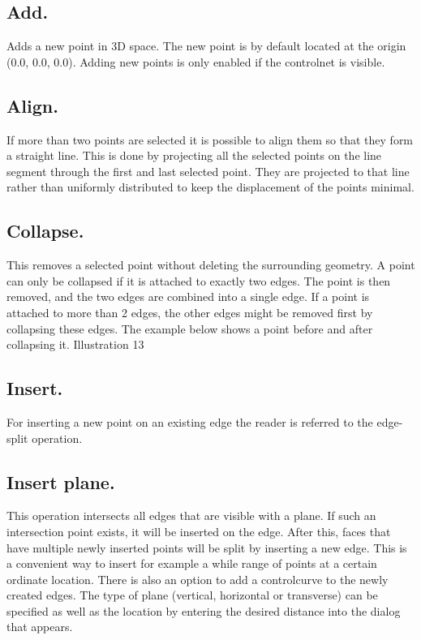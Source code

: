 \documentclass[12pt]{article}
\begin{document}
\subsection{Add.}
Adds a new point in 3D space. The new point is by default located at the origin (0.0, 0.0, 0.0).
Adding new points is only enabled if the controlnet is visible.

\subsection{Align.}
If more than two points are selected it is possible to align them so that they form a straight line. This
is done by projecting all the selected points on the line segment through the first and last selected
point. They are projected to that line rather than uniformly distributed to keep the displacement of
the points minimal.

\subsection{Collapse.} \label{point-collapse}
This removes a selected point without deleting the surrounding geometry. A point can only be
collapsed if it is attached to exactly two edges. The point is then removed, and the two edges are
combined into a single edge. If a point is attached to more than 2 edges, the other edges might be
removed first by collapsing these edges. The example below shows a point before and after
collapsing it.
Illustration 13

\subsection{Insert.}
For inserting a new point on an existing edge the reader is referred to the edge-split operation.

\subsection{Insert plane.}
This operation intersects all edges that are visible with a plane. If such an intersection point exists,
it will be inserted on the edge. After this, faces that have multiple newly inserted points will be split
by inserting a new edge. This is a convenient way to insert for example a while range of points at a
certain ordinate location. There is also an option to add a controlcurve to the newly created edges.
The type of plane (vertical, horizontal or transverse) can be specified as well as the location by
entering the desired distance into the dialog that appears.
\end{document}
